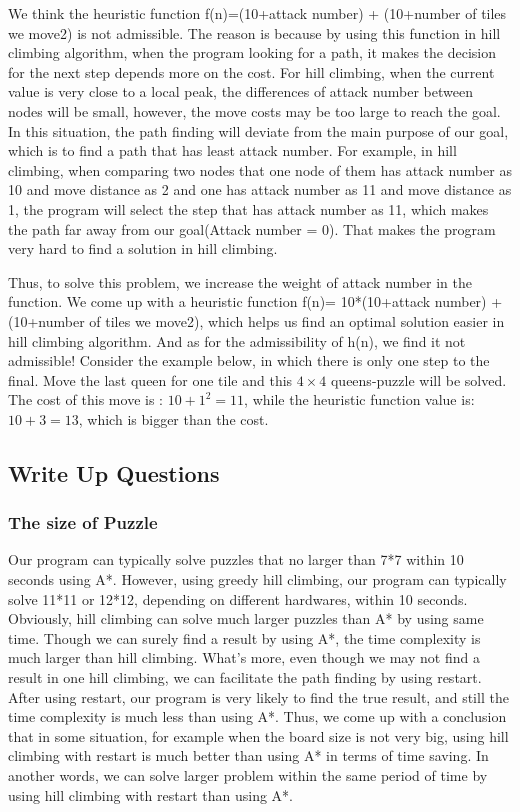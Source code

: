 \documentclass[11pt, a4paper]{article}
\begin{document}
We think the heuristic function f(n)=(10+attack number) + (10+number of tiles we move2) is not admissible. The reason is because by using this function in hill climbing algorithm, when the program looking for a path, it makes the decision for the next step depends more on the cost. For hill climbing, when the current value is very close to a local peak, the differences of attack number between nodes will be small, however, the move costs may be too large to reach the goal.  In this situation, the path finding will deviate from the main purpose of our goal, which is to find a path that has least attack number. For example, in hill climbing, when comparing two nodes that one node of them has attack number as 10 and move distance as 2 and one has attack number as 11 and move distance as 1, the program will select the step that has attack number as 11, which makes the path far away from our goal(Attack number = 0). That makes the program very hard to find a solution in hill climbing.

Thus, to solve this problem, we increase the weight of attack number in the function. We come up with a heuristic function f(n)= 10*(10+attack number) + (10+number of tiles we move2), which helps us find an optimal solution easier in hill climbing algorithm.
And as for the admissibility of h(n), we find it not admissible!
Consider the example below, in which there is only one step to the final. Move the last queen for one tile and this $4\times4$ queens-puzzle will be solved. The cost of this move is : $10+1^2=11$, while the heuristic function value is: $10+3=13$, which is bigger than the cost.


\subsection{Write Up Questions}

\subsubsection{The size of Puzzle}

Our program can typically solve puzzles that no larger than 7*7 within 10 seconds using A*. However, using greedy hill climbing, our program can typically solve 11*11 or 12*12, depending on different hardwares, within 10 seconds. Obviously, hill climbing can solve much larger puzzles than A* by using same time. Though we can surely find a result by using A*, the time complexity is much larger than hill climbing. What’s more, even though we may not find a result in one hill climbing, we can facilitate the path finding by using restart. After using restart, our program is very likely to find the true result, and still the time complexity is much less than using A*. Thus, we come up with a conclusion that in some situation, for example when the board size is not very big, using hill climbing with restart is much better than using A* in terms of time saving. In another words, we can solve larger problem within the same period of time by using hill climbing with restart than using A*.
\end{document}
